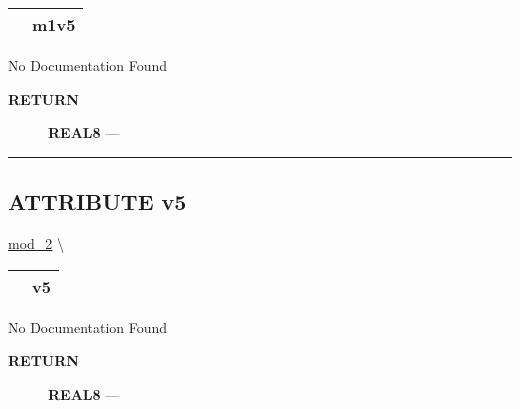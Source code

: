 {\renewcommand{\arraystretch}{1.5}
\begin{tabularx}{\textwidth}{|>{\raggedright\arraybackslash}l|X|}
\hline
\hspace{0pt}\mytexttt{\color{red} } & \textbf{m1v5} \\
\hline
\end{tabularx}
}

\par





No Documentation Found








\par
\begin{description}
\item [\colorbox{tagtype}{\color{white} \textbf{\textsf{RETURN}}}] \textbf{REAL8} --- 
\end{description}




\rule{\linewidth}{0.5pt}


\subsection*{\textsf{\colorbox{headtoc}{\color{white} ATTRIBUTE}
v5}}

\hypertarget{ecldoc:mod_2.v5}{}
\hspace{0pt} \hyperlink{ecldoc:mod_2}{mod_2} \textbackslash 

{\renewcommand{\arraystretch}{1.5}
\begin{tabularx}{\textwidth}{|>{\raggedright\arraybackslash}l|X|}
\hline
\hspace{0pt}\mytexttt{\color{red} } & \textbf{v5} \\
\hline
\end{tabularx}
}

\par





No Documentation Found








\par
\begin{description}
\item [\colorbox{tagtype}{\color{white} \textbf{\textsf{RETURN}}}] \textbf{REAL8} --- 
\end{description}




